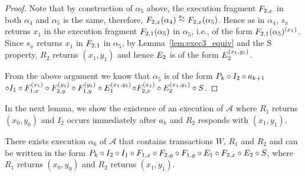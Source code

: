 \begin{proof}
Note that by construction of $\alpha_5$ above,  the execution fragment  $\fragt{F_{2,x}}{\alpha_4}{}$ in both $\alpha_4$ and $\alpha_5$ is the same, therefore,   $\frage{F_{2,x}}{\alpha_4}{} \stackrel{s_x}{\sim} \frage{F_{2,x}}{\alpha_5}{}$. Hence as in 
$\alpha_4$,  $s_x$  returns $x_1$  in the execution fragment  $\frage{F_{2, 1}}{\alpha_5}{}$  in   $\alpha_5$,  i.e.,  of the form $\frage{F_{2, 1}}{\alpha_5}{x_1}$.
Since $s_x$ returns $x_1$ in $\fragt{F_{2, 1}}{\alpha_5}{}$ in $\alpha_5$,  by   
Lemma~\ref{lem:exec3_equiv}  and   the S property,
  $R_2$ returns $(x_1, y_1)$  and hence $\fragt{E_2}{\alpha_5}{}$ is of the form $\fragt{E_2}{\alpha_5}{x_1, y_1}$.

From the above argument we know that  $\alpha_5$ is of the form $ \finiteprefixA{k-1}{k} \circ \fragt{I_2}{\alpha_5}{}  \circ a_{k+1} $$ \circ \fragt{I_1}{\alpha_5}{}
\circ \fragt{F_{1,x}}{\alpha_5}{x_1} \circ \fragt{F_{2,y}}{\alpha_5}{y_1} \circ  \fragt{F_{1,y}}{\alpha_5}{y_1} \circ \fragt{E_1}{\alpha_5}{x_1, y_1}
$$\circ \fragt{F_{2,x}}{\alpha_5}{x_1} \circ  \fragt{E_2}{\alpha_5}{x_1, y_1}\circ \fragt{S}{\alpha_5}{}$.
\end{proof}


In the next lemma, we show the existence of an execution of $\mathcal{A}$ where $R_1$ returns $(x_0, y_0)$  and $I_2$ occurs immediately after $a_{k}$ and 
 $R_2$ responds with $(x_1, y_1)$. 
\begin{lemma} \label{lem:exec3_alpha5} 
\sloppy There exists  execution $\alpha_6$  of $\mathcal{A}$ that contains transactions $W$, $R_1$ and $R_2$ and can be
written in the form 
$ \finiteprefixA{k-1}{k} \circ\fragt{I_2}{\alpha_6}{} \circ  \fragt{I_1}{\alpha_6}{} \circ\fragn{F_{1,x}}{\alpha_6}{x_0}
\circ\fragn{F_{2,y}}{\alpha_6}{y_1}\circ \fragn{F_{1,y}}{\alpha_6}{y_0} \circ\fragn{E_1}{\alpha_6}{x_0, y_0}
\circ\fragn{F_{2,x}}{\alpha_6}{x_1} \circ \fragn{E_2}{\alpha_6}{x_1, y_1}\circ \fragt{S}{\alpha_6}{}$, 
where  $R_1$ returns $(x_0, y_0)$  and $R_2$ returns $(x_1, y_1)$.
\end{lemma}

